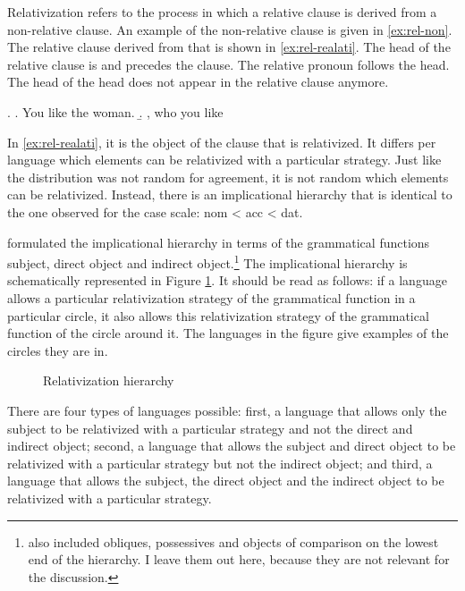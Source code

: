 Relativization refers to the process in which a relative clause is derived from a non-relative clause. An example of the non-relative clause is given in \ref{ex:rel-non}. The relative clause derived from that is shown in \ref{ex:rel-realati}. The head of the relative clause is  and precedes the clause. The relative pronoun follows the head. The head of the head does not appear in the relative clause anymore.

\ex.
\a. You like the woman. \label{ex:rel-non}
\b.  , who you like \label{ex:rel-realati}

In \ref{ex:rel-realati}, it is the object of the clause that is relativized. It differs per language which elements can be relativized with a particular strategy. Just like the distribution was not random for agreement, it is not random which elements can be relativized. Instead, there is an implicational hierarchy that is identical to the one observed for the case scale: \ac{nom} < \ac{acc} < \ac{dat}.

\citet{keenan1977} formulated the implicational hierarchy in terms of the grammatical functions subject, direct object and indirect object.\footnote{
\citet{keenan1977} also included obliques, possessives and objects of comparison on the lowest end of the hierarchy. I leave them out here, because they are not relevant for the discussion.
}
The implicational hierarchy is schematically represented in Figure \ref{fig:rel-sub-do-io}. It should be read as follows: if a language allows a particular relativization strategy of the grammatical function in a particular circle, it also allows this relativization strategy of the grammatical function of the circle around it. The languages in the figure give examples of the circles they are in.

\begin{figure}[H]
  \centering
  \caption{Relativization hierarchy}
  \label{fig:rel-sub-do-io}
\end{figure}

There are four types of languages possible: first, a language that allows only the subject to be relativized with a particular strategy and not the direct and indirect object; second, a language that allows the subject and direct object to be relativized with a particular strategy but not the indirect object; and third, a language that allows the subject, the direct object and the indirect object to be relativized with a particular strategy.

